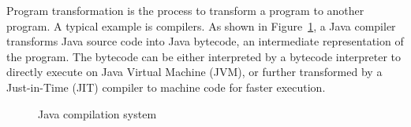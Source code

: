 \documentclass[runningheads,a4paper]{llncs}
\begin{document}
Program transformation is the process to transform a program to another program. A typical example is compilers. As shown in Figure~\ref{fig:javacompilation}, a Java compiler transforms Java source code into Java bytecode, an intermediate representation of the program. The bytecode can be either interpreted by a bytecode interpreter to directly execute on Java Virtual Machine (JVM), or further transformed by a Just-in-Time (JIT) compiler to machine code for faster execution.

\begin{figure}
\centering
{}
\caption{Java compilation system}
\label{fig:javacompilation}
\end{figure}

\end{document}
